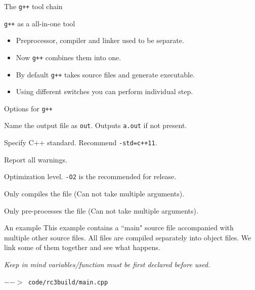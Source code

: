 \begin{frame}{The \texttt{g++} tool chain}
\begin{block}{\texttt{g++} as a all-in-one tool}
	\vspace{-0.07in}
	\begin{itemize}
		\item Preprocessor, compiler and linker used to be separate.
		\item Now \texttt{g++} combines them into one.
		\item By default \texttt{g++} takes source files and generate executable.
		\item Using different switches you can perform individual step.
	\end{itemize}
\end{block}
\vspace{-0.15in}
\begin{block}{Options for \texttt{g++}}
	\vspace{-0.07in}
	\begin{description}[-O\{0123\}]
		\small
		\item[-o out] Name the output file as \texttt{out}. Outputs \texttt{a.out} if not present.
		\item[-std=] Specify C++ standard. Recommend \texttt{-std=c++11}.
		\item[-Wall] Report all warnings.
		\item[-O\{0123\}] Optimization level. \texttt{-O2} is the recommended for release.
		\item[-c] Only compiles the file (Can not take multiple arguments).
		\item[-E] Only pre-processes the file (Can not take multiple arguments).
	\end{description}
\end{block}
\end{frame}

\begin{frame}[fragile]{An example}
This example contains a ``main" source file accompanied with multiple other source files. All files are compiled separately into object files. We link some of them together and see what happens.

\vspace{0.04in}
\textit{Keep in mind variables/function must be first declared before used.}

\vspace{0.04in}
\texttt{$-->$ code/rc3build/main.cpp}
\inputminted{c++}{code/rc3build/main.cpp}
\end{frame}

